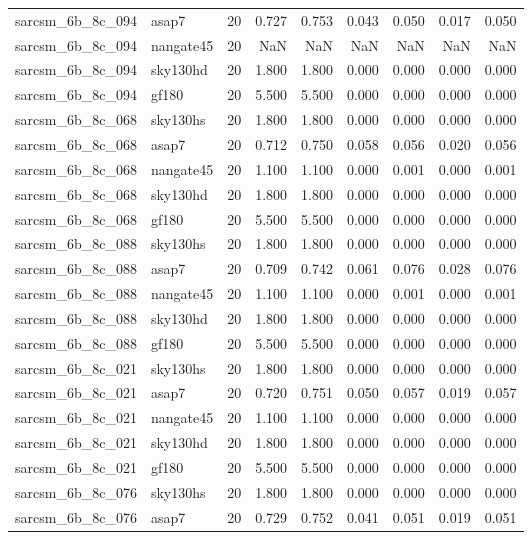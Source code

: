 \begin{tabular}{llrrrrrrr}
sarcsm\_6b\_8c\_094 & asap7 & 20 & 0.727 & 0.753 & 0.043 & 0.050 & 0.017 & 0.050 \\
sarcsm\_6b\_8c\_094 & nangate45 & 20 & NaN & NaN & NaN & NaN & NaN & NaN \\
sarcsm\_6b\_8c\_094 & sky130hd & 20 & 1.800 & 1.800 & 0.000 & 0.000 & 0.000 & 0.000 \\
sarcsm\_6b\_8c\_094 & gf180 & 20 & 5.500 & 5.500 & 0.000 & 0.000 & 0.000 & 0.000 \\
sarcsm\_6b\_8c\_068 & sky130hs & 20 & 1.800 & 1.800 & 0.000 & 0.000 & 0.000 & 0.000 \\
sarcsm\_6b\_8c\_068 & asap7 & 20 & 0.712 & 0.750 & 0.058 & 0.056 & 0.020 & 0.056 \\
sarcsm\_6b\_8c\_068 & nangate45 & 20 & 1.100 & 1.100 & 0.000 & 0.001 & 0.000 & 0.001 \\
sarcsm\_6b\_8c\_068 & sky130hd & 20 & 1.800 & 1.800 & 0.000 & 0.000 & 0.000 & 0.000 \\
sarcsm\_6b\_8c\_068 & gf180 & 20 & 5.500 & 5.500 & 0.000 & 0.000 & 0.000 & 0.000 \\
sarcsm\_6b\_8c\_088 & sky130hs & 20 & 1.800 & 1.800 & 0.000 & 0.000 & 0.000 & 0.000 \\
sarcsm\_6b\_8c\_088 & asap7 & 20 & 0.709 & 0.742 & 0.061 & 0.076 & 0.028 & 0.076 \\
sarcsm\_6b\_8c\_088 & nangate45 & 20 & 1.100 & 1.100 & 0.000 & 0.001 & 0.000 & 0.001 \\
sarcsm\_6b\_8c\_088 & sky130hd & 20 & 1.800 & 1.800 & 0.000 & 0.000 & 0.000 & 0.000 \\
sarcsm\_6b\_8c\_088 & gf180 & 20 & 5.500 & 5.500 & 0.000 & 0.000 & 0.000 & 0.000 \\
sarcsm\_6b\_8c\_021 & sky130hs & 20 & 1.800 & 1.800 & 0.000 & 0.000 & 0.000 & 0.000 \\
sarcsm\_6b\_8c\_021 & asap7 & 20 & 0.720 & 0.751 & 0.050 & 0.057 & 0.019 & 0.057 \\
sarcsm\_6b\_8c\_021 & nangate45 & 20 & 1.100 & 1.100 & 0.000 & 0.000 & 0.000 & 0.000 \\
sarcsm\_6b\_8c\_021 & sky130hd & 20 & 1.800 & 1.800 & 0.000 & 0.000 & 0.000 & 0.000 \\
sarcsm\_6b\_8c\_021 & gf180 & 20 & 5.500 & 5.500 & 0.000 & 0.000 & 0.000 & 0.000 \\
sarcsm\_6b\_8c\_076 & sky130hs & 20 & 1.800 & 1.800 & 0.000 & 0.000 & 0.000 & 0.000 \\
sarcsm\_6b\_8c\_076 & asap7 & 20 & 0.729 & 0.752 & 0.041 & 0.051 & 0.019 & 0.051 \\

\end{tabular}
